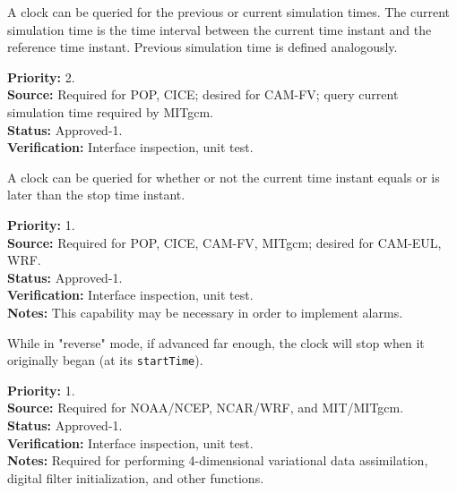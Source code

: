 A clock can be queried for the previous or current simulation times.
The current simulation time is the time interval between
the current time instant and the reference time instant.  Previous
simulation time is defined analogously.
\begin{reqlist}
{\bf Priority:} 2.\\
{\bf Source:} Required for POP, CICE; desired for CAM-FV; query current simulation time 
required by MITgcm. \\
{\bf Status:} Approved-1. \\
{\bf Verification:} Interface inspection, unit test. 
\end{reqlist}

A clock can be queried for whether or not the current time instant
equals or is later than the stop time instant.
\begin{reqlist}
{\bf Priority:} 1. \\
{\bf Source:} Required for POP, CICE, CAM-FV, MITgcm; desired for CAM-EUL, WRF. \\
{\bf Status:} Approved-1. \\
{\bf Verification:} Interface inspection, unit test. \\ 
{\bf Notes:} This capability may be necessary in order to implement alarms.
\end{reqlist}

While in "reverse" mode, if advanced far enough, the clock will stop when it originally began (at its {\tt startTime}).
\begin{reqlist}
{\bf Priority:} 1. \\
{\bf Source:} Required for NOAA/NCEP, NCAR/WRF, and MIT/MITgcm. \\
{\bf Status:} Approved-1. \\
{\bf Verification:} Interface inspection, unit test. \\
{\bf Notes:} Required for performing 4-dimensional variational data assimilation, digital filter initialization, and other functions.
\end{reqlist}

